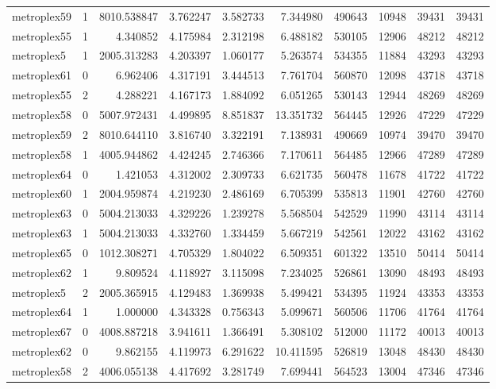 \begin{longtable}{|l|r|r|r|r|r|r|r|r|r|}
metroplex59 & 1 & 8010.538847 & 3.762247 & 3.582733 & 7.344980 & 490643 & 10948 & 39431 & 39431 \\
metroplex55 & 1 & 4.340852 & 4.175984 & 2.312198 & 6.488182 & 530105 & 12906 & 48212 & 48212 \\
metroplex5 & 1 & 2005.313283 & 4.203397 & 1.060177 & 5.263574 & 534355 & 11884 & 43293 & 43293 \\
metroplex61 & 0 & 6.962406 & 4.317191 & 3.444513 & 7.761704 & 560870 & 12098 & 43718 & 43718 \\
metroplex55 & 2 & 4.288221 & 4.167173 & 1.884092 & 6.051265 & 530143 & 12944 & 48269 & 48269 \\
metroplex58 & 0 & 5007.972431 & 4.499895 & 8.851837 & 13.351732 & 564445 & 12926 & 47229 & 47229 \\
metroplex59 & 2 & 8010.644110 & 3.816740 & 3.322191 & 7.138931 & 490669 & 10974 & 39470 & 39470 \\
metroplex58 & 1 & 4005.944862 & 4.424245 & 2.746366 & 7.170611 & 564485 & 12966 & 47289 & 47289 \\
metroplex64 & 0 & 1.421053 & 4.312002 & 2.309733 & 6.621735 & 560478 & 11678 & 41722 & 41722 \\
metroplex60 & 1 & 2004.959874 & 4.219230 & 2.486169 & 6.705399 & 535813 & 11901 & 42760 & 42760 \\
metroplex63 & 0 & 5004.213033 & 4.329226 & 1.239278 & 5.568504 & 542529 & 11990 & 43114 & 43114 \\
metroplex63 & 1 & 5004.213033 & 4.332760 & 1.334459 & 5.667219 & 542561 & 12022 & 43162 & 43162 \\
metroplex65 & 0 & 1012.308271 & 4.705329 & 1.804022 & 6.509351 & 601322 & 13510 & 50414 & 50414 \\
metroplex62 & 1 & 9.809524 & 4.118927 & 3.115098 & 7.234025 & 526861 & 13090 & 48493 & 48493 \\
metroplex5 & 2 & 2005.365915 & 4.129483 & 1.369938 & 5.499421 & 534395 & 11924 & 43353 & 43353 \\
metroplex64 & 1 & 1.000000 & 4.343328 & 0.756343 & 5.099671 & 560506 & 11706 & 41764 & 41764 \\
metroplex67 & 0 & 4008.887218 & 3.941611 & 1.366491 & 5.308102 & 512000 & 11172 & 40013 & 40013 \\
metroplex62 & 0 & 9.862155 & 4.119973 & 6.291622 & 10.411595 & 526819 & 13048 & 48430 & 48430 \\
metroplex58 & 2 & 4006.055138 & 4.417692 & 3.281749 & 7.699441 & 564523 & 13004 & 47346 & 47346 \\

\end{longtable}
